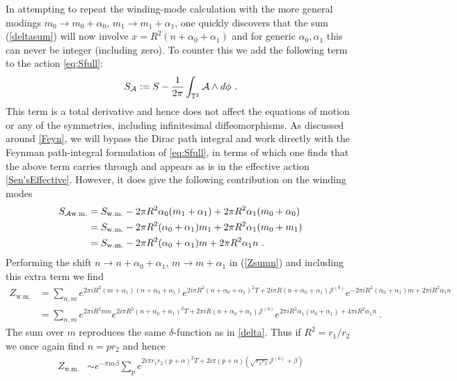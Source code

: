 \documentclass[11pt]{article}
\numberwithin{equation}{section}
\begin{document}
\begin{appendix}
In attempting to repeat the winding-mode calculation with the more general modings $m_0\to m_0+\alpha_0$, $m_1\to m_1+\alpha_1$, one quickly discovers that the sum (\ref{deltasum}) will now involve $x= R^2(n+\alpha_0+\alpha_1) $ and for generic $\alpha_0,\alpha_1$ this can never be integer (including zero). 
To counter this we add the following term to the action \eqref{eq:Sfull}:
\begin{align}\label{topterm}
S_{\cal A} :=  S - \frac{1}{2\pi}\int_{\mathbb T^2} {\cal A}	\wedge d\phi\ .
\end{align}
This term is a total derivative  and hence does not affect the equations of motion or any of the symmetries, including infinitesimal diffeomorphisms. As discussed around \eqref{Feyn}, we will bypass the Dirac path integral and work directly with the Feynman path-integral formulation of \eqref{eq:Sfull}, in terms of which one finds that the above term carries through and appears as is in the effective action \eqref{Sen'sEffective}. However, it does give the following contribution on the winding modes
\begin{align}
S_{{\cal A}\text{w.m.}} & =  S_{\text{w.m.}} - 2\pi R^2 \alpha_0(m_1+\alpha_1)	+2\pi R^2\alpha_1(m_0+\alpha_0)\nonumber\\
& =  S_{\text{w.m.}} - 2\pi R^2 (\alpha_0+\alpha_1 )m_1 + 2\pi R^2\alpha_1(m_0+m_1)\nonumber\\
& =  S_{\text{w.m.}} - 2\pi R^2 (\alpha_0+\alpha_1 )m + 2\pi R^2\alpha_1n
\ .
\end{align}
Performing the shift $n\to n +\alpha_0+\alpha_1$, $m\to m+\alpha_1$ in 
(\ref{Zsumn}) and including this extra term we find
\begin{align}
Z_{\text{w.m.}}
&= \sum_{n,m} e^{2\pi i R^2(m+\alpha_1)(n+\alpha_0+\alpha_1)}e^{2i\pi R^2(n+\alpha_0+\alpha_1)^2T +2i\pi R (n+\alpha_0+\alpha_1)\mathcal{J}^{(0)}} e^{-2\pi i R^2 (\alpha_0+\alpha_1 )m + 2\pi iR^2\alpha_1n}
\nonumber\\
& =  \sum_{n,m} e^{2\pi i R^2mn}e^{2i\pi R^2(n+\alpha_0+\alpha_1)^2T +2\pi i R (n+\alpha_0+\alpha_1)\mathcal{J}^{(0)}}  e^{2\pi i R^2 \alpha_1(\alpha_0+\alpha_1 ) + 4\pi iR^2\alpha_1n}\ .
\end{align}
The sum over $m$ reproduces the same $\delta$-function as in \eqref{delta}. Thus if $R^2=r_1/r_2$  we once again find $n=pr_2$ and hence
\begin{align}
Z_{\text{w.m.}}
&\sim e^{-\pi i\alpha\beta} \sum_p 	e^{2i\pi r_1r_2(p+\alpha)^2T +2i\pi  (p+\alpha)(\sqrt{r_1r_2}\mathcal{J}^{(0)}+\beta)}  \nonumber\\

\end{align}
\end{appendix}
\end{document}
